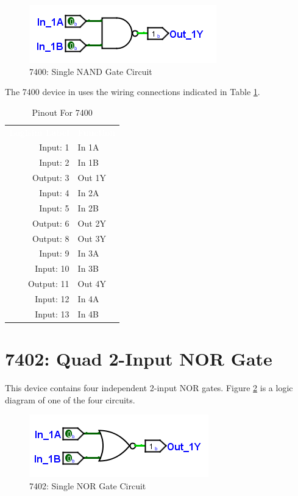 \begin{figure}[H]
	\centering
	\includegraphics{gfx/app_ttl-7400}
	\caption{7400: Single NAND Gate Circuit}
	\label{fig:app_ttl-7400}
\end{figure}

The 7400 device in \LE uses the wiring connections indicated in Table \ref{tab:50-7400}.

\begin{table}[H]
	\sffamily
	\newcommand{\head}[1]{\textcolor{white}{\textbf{#1}}}		
	\begin{center}
		\begin{tabular}{rl} 
			\rowcolor{black!75}
			\head{Logisim Label} & \head{Function} \\
			Input: 1   & In 1A  \\
			Input: 2   & In 1B  \\
			Output: 3  & Out 1Y \\
			Input: 4   & In 2A  \\
			Input: 5   & In 2B  \\
			Output: 6  & Out 2Y \\
			Output: 8  & Out 3Y \\
			Input: 9   & In 3A  \\
			Input: 10  & In 3B  \\
			Output: 11 & Out 4Y \\
			Input: 12  & In 4A  \\
			Input: 13  & In 4B  \\
		\end{tabular}
	\end{center}
	\caption{Pinout For 7400}
	\label{tab:50-7400}
\end{table}

\section{7402: Quad 2-Input NOR Gate}

This device contains four independent 2-input NOR gates. Figure \ref{fig:app_ttl-7402} is a logic diagram of one of the four circuits.

\begin{figure}[H]
	\centering
	\includegraphics{gfx/app_ttl-7402}
	\caption{7402: Single NOR Gate Circuit}
	\label{fig:app_ttl-7402}
\end{figure}

